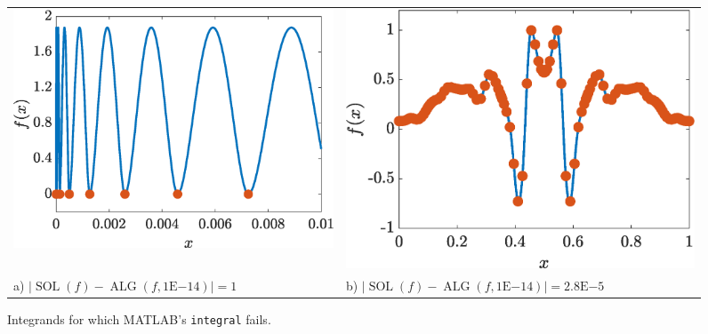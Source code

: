\documentclass[11pt]{NSFamsart}
\DeclareMathOperator{\SOL}{SOL}
\DeclareMathOperator{\ALG}{ALG}
\def\abs#1{\ensuremath{\left \lvert #1 \right \rvert}}
\begin{document}
\newlength{\figwidthA}
\setlength{\figwidthA}{0.45\textwidth}
\newlength{\figheightB}
\setlength{\figheightB}{0.2\textwidth}
\begin{figure}[h]
	\begin{tabular}{>{\centering}m{\figwidthA}@{\qquad}>{\centering}m{\figwidthA}}
		\includegraphics[height=\figheightB]{ProgramsImages/SpikyFoolIntegralcolor.eps} &
		\includegraphics[height=\figheightB]{ProgramsImages/FlukyFoolIntegralcolor.eps} 
		\tabularnewline
		a) $\abs{\SOL(f) - \ALG(f,1\text{E}{-14})} = 1 $ &
		b) $\abs{\SOL(f) - \ALG(f,1\text{E}{-14})} =  2.8\text{E}{-5}$
		\end{tabular}
	\caption{Integrands for which MATLAB's \texttt{integral} fails. \label{quadfailfig}}
\end{figure}
\end{document}
